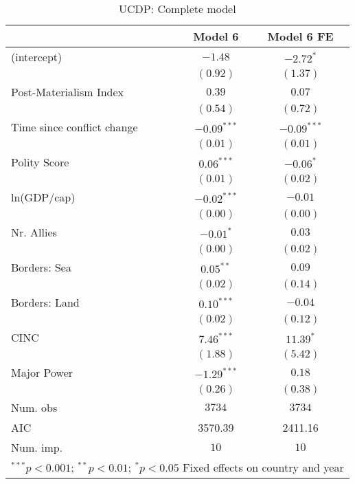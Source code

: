 
\begin{table}
\begin{center}
\begin{tabular}{l c c}
\toprule
 & Model 6 & Model 6 FE \\
\midrule
(intercept)                & $-1.48$       & $-2.72^{*}$   \\
                           & $(0.92)$      & $(1.37)$      \\
Post-Materialism Index     & $0.39$        & $0.07$        \\
                           & $(0.54)$      & $(0.72)$      \\
Time since conflict change & $-0.09^{***}$ & $-0.09^{***}$ \\
                           & $(0.01)$      & $(0.01)$      \\
Polity Score               & $0.06^{***}$  & $-0.06^{*}$   \\
                           & $(0.01)$      & $(0.02)$      \\
ln(GDP/cap)                & $-0.02^{***}$ & $-0.01$       \\
                           & $(0.00)$      & $(0.00)$      \\
Nr. Allies                 & $-0.01^{*}$   & $0.03$        \\
                           & $(0.00)$      & $(0.02)$      \\
Borders: Sea               & $0.05^{**}$   & $0.09$        \\
                           & $(0.02)$      & $(0.14)$      \\
Borders: Land              & $0.10^{***}$  & $-0.04$       \\
                           & $(0.02)$      & $(0.12)$      \\
CINC                       & $7.46^{***}$  & $11.39^{*}$   \\
                           & $(1.88)$      & $(5.42)$      \\
Major Power                & $-1.29^{***}$ & $0.18$        \\
                           & $(0.26)$      & $(0.38)$      \\
\midrule
Num. obs                   & $3734$        & $3734$        \\
AIC                        & 3570.39       & 2411.16       \\
Num. imp.                  & $10$          & $10$          \\
\bottomrule
\multicolumn{3}{l}{\scriptsize{$^{***}p<0.001$; $^{**}p<0.01$; $^{*}p<0.05$ 
 Fixed effects on country and year}}
\end{tabular}
\caption{UCDP: Complete model}
\label{UCDP_3_PM}
\end{center}
\end{table}

